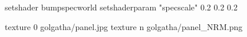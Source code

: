 setshader bumpspecworld
setshaderparam "specscale" 0.2 0.2 0.2

texture 0 golgatha/panel.jpg
texture n golgatha/panel_NRM.png
